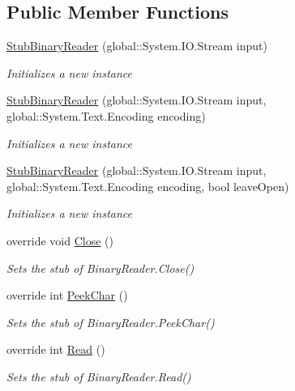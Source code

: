 \subsection*{Public Member Functions}
\begin{DoxyCompactItemize}
\item 
\hyperlink{class_system_1_1_i_o_1_1_fakes_1_1_stub_binary_reader_a65ef30808424e24a57245aa0cc2c1958}{Stub\-Binary\-Reader} (global\-::\-System.\-I\-O.\-Stream input)
\begin{DoxyCompactList}\small\item\em Initializes a new instance\end{DoxyCompactList}\item 
\hyperlink{class_system_1_1_i_o_1_1_fakes_1_1_stub_binary_reader_a0a72c16bcc7219feeeb8db67cb026869}{Stub\-Binary\-Reader} (global\-::\-System.\-I\-O.\-Stream input, global\-::\-System.\-Text.\-Encoding encoding)
\begin{DoxyCompactList}\small\item\em Initializes a new instance\end{DoxyCompactList}\item 
\hyperlink{class_system_1_1_i_o_1_1_fakes_1_1_stub_binary_reader_a3cb5b37ceb7f02a30a2cbf746c5ec079}{Stub\-Binary\-Reader} (global\-::\-System.\-I\-O.\-Stream input, global\-::\-System.\-Text.\-Encoding encoding, bool leave\-Open)
\begin{DoxyCompactList}\small\item\em Initializes a new instance\end{DoxyCompactList}\item 
override void \hyperlink{class_system_1_1_i_o_1_1_fakes_1_1_stub_binary_reader_a6728a561e902a858e9063c676ecb609f}{Close} ()
\begin{DoxyCompactList}\small\item\em Sets the stub of Binary\-Reader.\-Close()\end{DoxyCompactList}\item 
override int \hyperlink{class_system_1_1_i_o_1_1_fakes_1_1_stub_binary_reader_a55e92c83b83d9760e4f1349453b13a9e}{Peek\-Char} ()
\begin{DoxyCompactList}\small\item\em Sets the stub of Binary\-Reader.\-Peek\-Char()\end{DoxyCompactList}\item 
override int \hyperlink{class_system_1_1_i_o_1_1_fakes_1_1_stub_binary_reader_a60db039e9d9f2172b98c7f24b31f8f02}{Read} ()
\begin{DoxyCompactList}\small\item\em Sets the stub of Binary\-Reader.\-Read()\end{DoxyCompactList}\item 

\end{DoxyCompactItemize}
